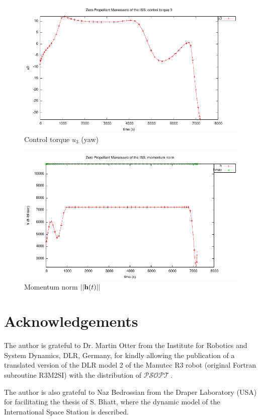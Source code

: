 \documentclass[a4paper,11pt]{report}    %
\newcommand{\psopt}{$\mathcal{PSOPT}$\,}  %
\newcommand{\mt}[1]{\ensuremath \mathbf{#1}}
\begin{document}
\begin{figure}
  \centering
  \includegraphics{../examples/zpm/zpm_u3}
  \caption{Control torque $u_3$ (yaw)}
 \label{fig:zpm_u3}
\end{figure}

\begin{figure}
  \centering
  \includegraphics{../examples/zpm/zpm_hnorm}
  \caption{Momentum norm $||\mt{h}(t)||$}
 \label{fig:zpm_hnorm}
\end{figure}

\chapter*{Acknowledgements}

The author is grateful to Dr. Martin Otter from the Institute for Robotics and System Dynamics, DLR, Germany, for kindly allowing the publication
of a translated version of the DLR model 2 of the Manutec R3 robot (original Fortran subroutine R3M2SI) with the distribution of \psopt.

The author is also grateful to Naz Bedrossian from the Draper Laboratory (USA)  for facilitating the thesis of S. Bhatt, where the dynamic model of the International Space Station 
is described.




\end{document}
